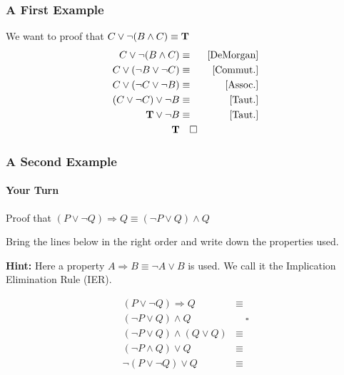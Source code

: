 \documentclass{beamer}
\theoremstyle{remark}
\begin{document}
\begin{frame}
	\frametitle{A First Example}
	We want to proof that $C \lor \lnot(B \land C) \equiv \text{{\bf T}}$
	\pause
	\begin{align}
		C \lor \lnot(B \land C)  & \equiv & \text{[DeMorgan]} \\
		C \lor (\lnot B \lor \lnot C) & \equiv & \text{[Commut.]} \\
		C \lor (\lnot C \lor \lnot B) & \equiv & \text{[Assoc.]} \\
		(C \lor \lnot C) \lor \lnot B & \equiv & \text{[Taut.]} \\
		\text{{\bf T}} \lor \lnot B & \equiv & \text{[Taut.]} \\
		\text{{\bf T}} & \hspace{1em}\square
	\end{align}
\end{frame}

\begin{frame}
	\frametitle{A Second Example}
	\framesubtitle{Your Turn}
	Proof that $(P \lor \lnot Q) \Rightarrow Q \equiv (\lnot P \lor Q) \land Q$

	Bring the lines below in the right order and write down the properties used.

	{\bf Hint:} Here a property $A \Rightarrow B \equiv \lnot A \lor B$ is used. We call it the Implication Elimination Rule (IER).

	\begin{align}
		(P \lor \lnot Q) \Rightarrow Q & \equiv \\
		(\lnot P \lor Q) \land Q & \hspace{1em}\square \\
		(\lnot P \lor Q) \land (Q \lor Q) & \equiv \\
		(\lnot P \land Q) \lor Q & \equiv \\
		\lnot(P \lor \lnot Q) \lor Q & \equiv
	\end{align}
\end{frame}
\end{document}
